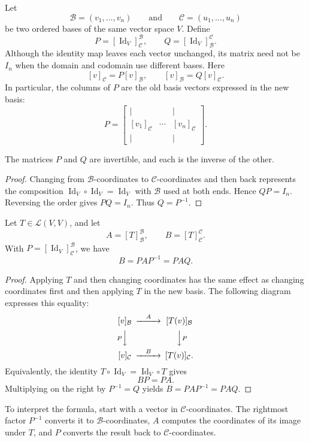 Let
\[
  \mathcal B=(v_1,\ldots,v_n)
  \qquad\text{and}\qquad
  \mathcal C=(u_1,\ldots,u_n)
\]
be two ordered bases of the same vector space $V$. Define
\[
  P=[\operatorname{Id}_V]_{\mathcal C}^{\mathcal B},
  \qquad
  Q=[\operatorname{Id}_V]_{\mathcal B}^{\mathcal C}.
\]
Although the identity map leaves each vector unchanged, its matrix
need not be $I_n$ when the domain and codomain use different bases.
Here
\[
  [v]_{\mathcal C}=P[v]_{\mathcal B},
  \qquad
  [v]_{\mathcal B}=Q[v]_{\mathcal C}.
\]
In particular, the columns of $P$ are the old basis vectors
expressed in the new basis:
\[
  P=
  \begin{bmatrix}
    \vert & & \vert \\
    [v_1]_{\mathcal C} & \cdots & [v_n]_{\mathcal C} \\
    \vert & & \vert
  \end{bmatrix}.
\]

\begin{proposition}\label{prop:change-of-basis-inverses}
  The matrices $P$ and $Q$ are invertible, and each is the inverse
  of the other.
\end{proposition}

\begin{proof}
  Changing from $\mathcal B$-coordinates to $\mathcal C$-coordinates
  and then back represents the composition
  $\operatorname{Id}_V\circ\operatorname{Id}_V=\operatorname{Id}_V$
  with $\mathcal B$ used at both ends. Hence $QP=I_n$.
  Reversing the order gives $PQ=I_n$. Thus $Q=P^{-1}$.
\end{proof}

\begin{proposition}
  \label{prop:change-of-basis-formula}
  Let $T\in\mathcal L(V,V)$, and let
  \[
    A=[T]_{\mathcal B}^{\mathcal B},
    \qquad
    B=[T]_{\mathcal C}^{\mathcal C}.
  \]
  With $P=[\operatorname{Id}_V]_{\mathcal C}^{\mathcal B}$,
  we have
  \[
    B=PAP^{-1}=PAQ.
  \]
\end{proposition}

\begin{proof}
  Applying $T$ and then changing coordinates has the same effect as
  changing coordinates first and then applying $T$ in the new basis.
  The following diagram expresses this equality:
  \[
    \begin{CD}
      [v]_{\mathcal B} @>{A}>> [T(v)]_{\mathcal B} \\
      @V{P}VV @VV{P}V \\
      [v]_{\mathcal C} @>{B}>> [T(v)]_{\mathcal C}.
    \end{CD}
  \]
  Equivalently, the identity
  $T\circ\operatorname{Id}_V=\operatorname{Id}_V\circ T$ gives
  \[
    BP=PA.
  \]
  Multiplying on the right by $P^{-1}=Q$ yields
  $B=PAP^{-1}=PAQ$.
\end{proof}

To interpret the formula, start with a vector in
$\mathcal C$-coordinates. The rightmost factor $P^{-1}$ converts it
to $\mathcal B$-coordinates, $A$ computes the coordinates of its
image under $T$, and $P$ converts the result back to
$\mathcal C$-coordinates.
